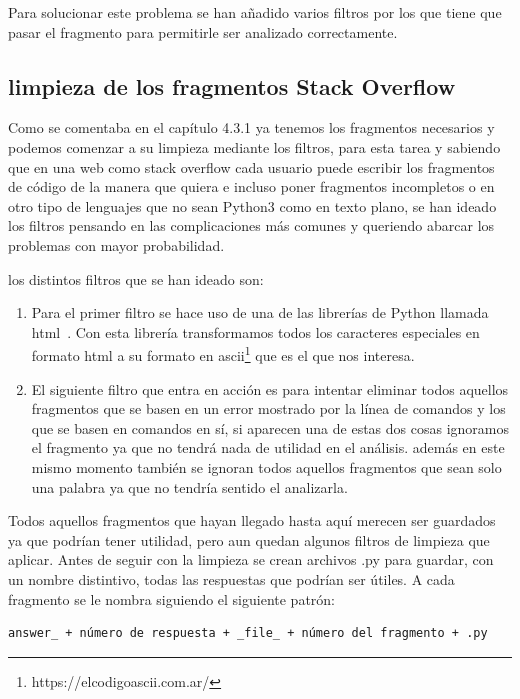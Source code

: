 \documentclass[a4paper, 12pt]{book}
\begin{document}
Para solucionar este problema se han añadido varios filtros por los que tiene que pasar el fragmento para permitirle ser analizado correctamente.

\subsection{limpieza de los fragmentos Stack Overflow}

Como se comentaba en el capítulo 4.3.1 ya tenemos los fragmentos necesarios y podemos comenzar a su limpieza mediante los filtros, para esta tarea y sabiendo que en una web como stack overflow cada usuario puede escribir los fragmentos de código de la manera que quiera e incluso poner fragmentos incompletos o en otro tipo de lenguajes que no sean Python3 como en texto plano, se han ideado los filtros pensando en las complicaciones más comunes y queriendo abarcar los problemas con mayor probabilidad.

los distintos filtros que se han ideado son:

\begin{enumerate}
	\item Para el primer filtro se hace uso de una de las librerías de Python llamada html~\cite{website:libreriahtml}. Con esta librería transformamos todos los caracteres especiales en formato html a su formato en ascii\footnote{https://elcodigoascii.com.ar/} que es el que nos interesa.
	\item El siguiente filtro que entra en acción es para intentar eliminar todos aquellos fragmentos que se basen en un error mostrado por la línea de comandos y los que se basen en comandos en sí, si aparecen una de estas dos cosas ignoramos el fragmento ya que no tendrá nada de utilidad en el análisis. además en este mismo momento también se ignoran todos aquellos fragmentos que sean solo una palabra ya que no tendría sentido el analizarla.
\end{enumerate}

Todos aquellos fragmentos que hayan llegado hasta aquí merecen ser guardados ya que podrían tener utilidad, pero aun quedan algunos filtros de limpieza que aplicar. Antes de seguir con la limpieza se crean archivos .py para guardar, con un nombre distintivo, todas las respuestas que podrían ser útiles. A cada fragmento se le nombra siguiendo el siguiente patrón:

\begin{verbatim}
answer_ + número de respuesta + _file_ + número del fragmento + .py
\end{verbatim}
\end{document}

